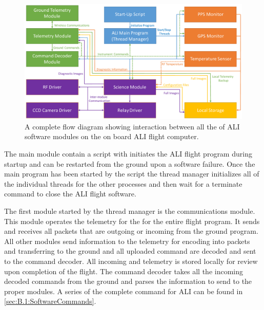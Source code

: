 \begin{figure}
        \centering
        \includegraphics[width=1.0\textwidth]{./Images/3-3-SoftwareFlowDiagram.pdf}
        \caption[ALI Software Flow Diagram]{A complete flow diagram showing interaction between all the of ALI software modules on the on board ALI flight computer.}
        \label{fig:3.3:softwareFlowDiagram}
\end{figure}

The main module contain a script with initiates the ALI flight program during startup and can be restarted from the ground upon a software failure. Once the main program has been started by the script the thread manager initializes all of the individual threads for the other processes and then wait for a terminate command to close the ALI flight software.

The first module started by the thread manager is the communications module. This module operates the telemetry for the for the entire flight program. It sends and receives all packets that are outgoing or incoming from the ground program. All other modules send information to the telemetry for encoding into packets and transferring to the ground and all uploaded command are decoded and sent to the command decoder. All incoming and telemetry is stored locally for review upon completion of the flight. The command decoder takes all the incoming decoded commands from the ground and parses the information to send to the proper modules. A series of the complete command for ALI can be found in \autoref{sec:B.1:SoftwareCommands}.

